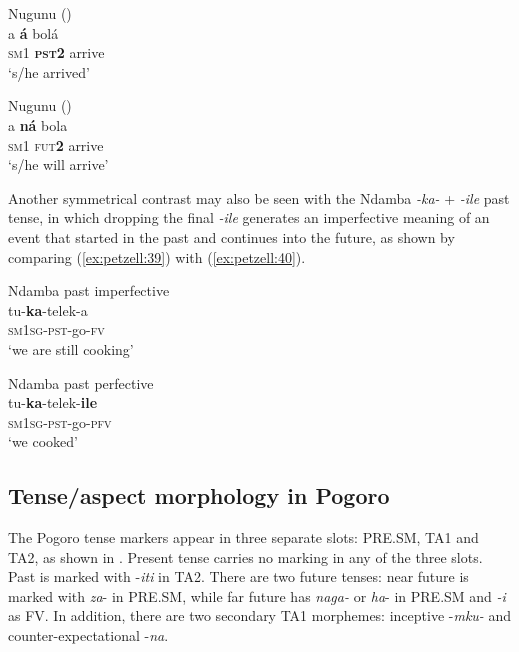 \documentclass[output=paper,
            colorlinks, citecolor=brown
            ,draftmode
		  ]{langscibook}
\begin{document}
\ea\label{ex:petzell:37}Nugunu (\citealt[321]{Gerhardt1989})\\
\gll a    \textbf{á}    bolá \\
\textsc{sm1}  \textsc{\textbf{pst}}\textbf{2}  arrive\\
\glt `s/he arrived'


\ex\label{ex:petzell:38}Nugunu (\citealt[326]{Gerhardt1989})\\
\gll a   \textbf{ná}    bola\\
\textsc{sm1}  \textsc{{fut}}\textbf{2}  arrive\\
\glt `s/he will arrive'
\z


Another symmetrical contrast may also be seen with the Ndamba \textit{{}-ka-} + \textit{{}-ile} past tense, in which dropping the final \textit{{}-ile} generates an imperfective meaning of an event that started in the past and continues into the future, as shown by comparing  (\ref{ex:petzell:39}) with  (\ref{ex:petzell:40}).


\ea\label{ex:petzell:39}Ndamba past imperfective\\
\gll tu-\textbf{ka}{}-telek-a  \\
\textsc{sm}1\textsc{sg}{}-\textsc{{pst}}{}-go-\textsc{fv}\\
\glt `we are still cooking'


\ex\label{ex:petzell:40}Ndamba past perfective\\
\gll tu-\textbf{ka}{}-telek-\textbf{ile} \\
\textsc{sm}1\textsc{sg}{}-\textsc{{pst}}{}-go-\textsc{{pfv}}\\
\glt `we cooked'
\z

\subsection{Tense/aspect morphology in Pogoro}
\label{sec:petzell:3.6}
The Pogoro tense markers appear in three separate slots: PRE.SM, TA1 and TA2, as shown in . Present tense carries no marking in any of the three slots. Past is marked with -\textit{iti} in TA2. There are two future tenses: near future is marked with \textit{za}{}- in PRE.SM, while far future has \textit{naga-} or \textit{ha}{}- in PRE.SM and \textit{{}-i} as FV. In addition, there are two secondary TA1 morphemes: inceptive -\textit{mku-} and counter-expectational -\textit{na}.
\end{document}
